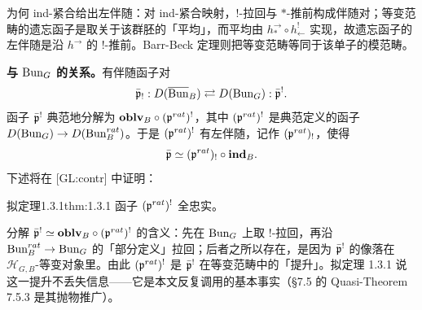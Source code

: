 \begin{annote}
为何 ind-紧合给出左伴随：对 ind-紧合映射，$!$-拉回与 $*$-推前构成伴随对；等变范畴的遗忘函子是取关于该群胚的「平均」，而平均由 $h^\rightarrow_*\circ h^!_\leftarrow$ 实现，故遗忘函子的左伴随是沿 $h^\rightarrow$ 的 $!$-推前。Barr-Beck 定理则把等变范畴等同于该单子的模范畴。\par\vspace{0.15em}{\raggedleft 【来源：原书 p.2 §1.2（A）；[GL:DG] 关于 D-模六函子形式的约定（A）】\par}
\end{annote}

\textbf{与 $\operatorname{Bun}_G$ 的关系。}有伴随函子对
\[
  \bar{\mathfrak{p}}_! : D(\overline{\mathrm{Bun}}_B)\rightleftarrows D(\operatorname{Bun}_G) : \bar{\mathfrak{p}}^! .
\]
函子 $\bar{\mathfrak{p}}^!$ 典范地分解为 $\mathbf{oblv}_B\circ(\mathfrak{p}^{rat})^!$，其中 $(\mathfrak{p}^{rat})^!$ 是典范定义的函子 $D(\operatorname{Bun}_G)\to D(\operatorname{Bun}^{rat}_B)$。于是 $(\mathfrak{p}^{rat})^!$ 有左伴随，记作 $(\mathfrak{p}^{rat})_!$，使得
\[
  \bar{\mathfrak{p}} \simeq (\mathfrak{p}^{rat})_!\circ\mathbf{ind}_B .
\]
下述将在 [GL:contr] 中证明：

\begin{othm}{拟定理}{1.3.1}{thm:1.3.1}
函子 $(\mathfrak{p}^{rat})^!$ 全忠实。
\end{othm}

\begin{annote}
分解 $\bar{\mathfrak{p}}^!\simeq\mathbf{oblv}_B\circ(\mathfrak{p}^{rat})^!$ 的含义：先在 $\operatorname{Bun}_G$ 上取 $!$-拉回，再沿 $\operatorname{Bun}^{rat}_B\to\operatorname{Bun}_G$ 的「部分定义」拉回；后者之所以存在，是因为 $\bar{\mathfrak{p}}^!$ 的像落在 $\mathcal H_{G,B}$-等变对象里。由此 $(\mathfrak{p}^{rat})^!$ 是 $\bar{\mathfrak{p}}^!$ 在等变范畴中的「提升」。拟定理 1.3.1 说这一提升不丢失信息——它是本文反复调用的基本事实（§7.5 的 Quasi-Theorem 7.5.3 是其抛物推广）。\par\vspace{0.15em}{\raggedleft 【来源：原书 p.2 §1.3（A）；译者按（上下文推断，无外部依据）】\par}
\end{annote}
